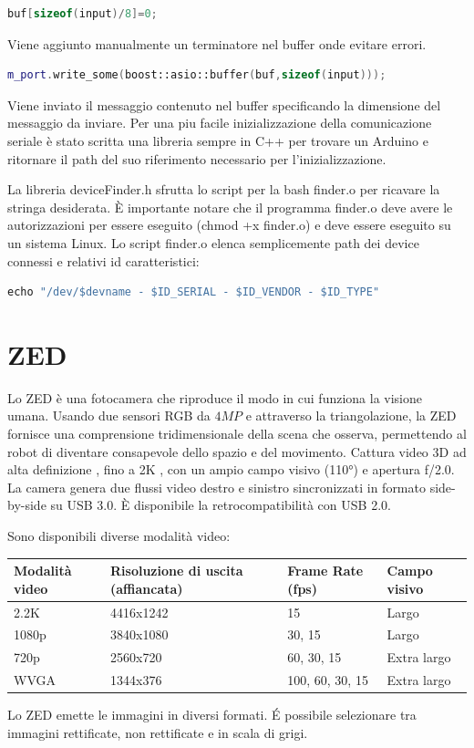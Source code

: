 \documentclass[a4paper]{article}
\begin{document}
\begin{lstlisting}[language=C++,firstnumber=27]
buf[sizeof(input)/8]=0;
\end{lstlisting}
Viene aggiunto manualmente un terminatore nel buffer onde evitare errori.

\begin{lstlisting}[language=C++,firstnumber=28]
m_port.write_some(boost::asio::buffer(buf,sizeof(input)));
\end{lstlisting}
Viene inviato il messaggio contenuto nel buffer specificando la dimensione del messaggio da inviare.
\newpage
Per una piu facile inizializzazione della comunicazione seriale è stato scritta una libreria sempre in C++ per trovare un Arduino e ritornare il path del suo riferimento necessario per l'inizializzazione.


La libreria deviceFinder.h sfrutta lo script per la bash finder.o per ricavare la stringa desiderata.
È importante notare che il programma finder.o deve avere le autorizzazioni per essere eseguito (chmod +x finder.o) e deve essere eseguito su un sistema Linux.
Lo script finder.o elenca semplicemente path dei device connessi e relativi id caratteristici:
\begin{lstlisting}[language=C++,firstnumber=8]
echo "/dev/$devname - $ID_SERIAL - $ID_VENDOR - $ID_TYPE"
\end{lstlisting}

\newpage


\section{ZED}

Lo ZED è una fotocamera che riproduce il modo in cui funziona la visione umana. Usando due sensori RGB da $4MP$ e attraverso la triangolazione, la ZED fornisce una comprensione tridimensionale della scena che osserva, permettendo al robot di diventare consapevole dello spazio e del movimento.
Cattura video 3D ad alta definizione , fino a 2K , con un ampio campo visivo (\ang{110}) e apertura f/2.0. La camera genera due flussi video destro e sinistro sincronizzati in formato side-by-side su USB 3.0. È disponibile la retrocompatibilità con USB 2.0. 

Sono disponibili diverse modalità video:
\begin{center}
\begin{tabular}{llll}
\toprule
Modalità video &Risoluzione di uscita (affiancata) &	Frame Rate (fps) &	Campo visivo \\
\midrule
2.2K&	4416x1242&	15	 &Largo \\
1080p	&3840x1080&	30, 15&	Largo\\
720p&	2560x720&	60, 30, 15&	Extra largo\\
WVGA&	1344x376&	100, 60, 30, 15&	Extra largo\\
\bottomrule
\end{tabular}
\end{center}
Lo ZED emette le immagini in diversi formati. 
\'E possibile selezionare tra immagini rettificate, non rettificate e in scala di grigi.
\end{document}
